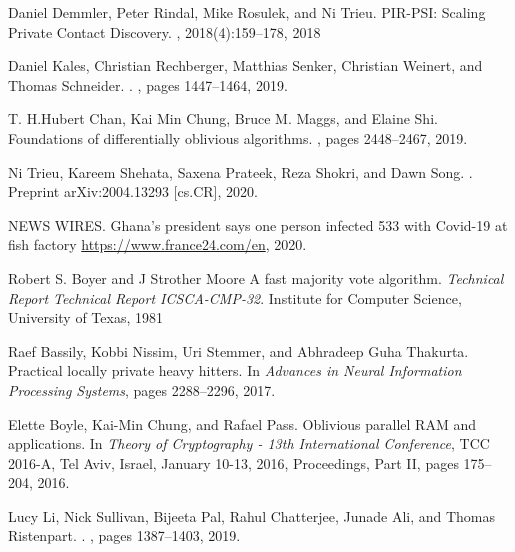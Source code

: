 \documentclass[11pt,dvipdfmx]{article}  %
\begin{document}
\begin{thebibliography}{10}
\begin{small}
 Daniel Demmler, Peter Rindal, Mike Rosulek, and
Ni Trieu. \newblock PIR-PSI: Scaling Private Contact Discovery.
, 2018(4):159–178, 2018

Daniel Kales, Christian Rechberger, Matthias Senker, Christian Weinert, and
  Thomas Schneider.
.
, pages
  1447--1464, 2019.
  
 T. H.Hubert Chan, Kai Min Chung, Bruce M. Maggs, and Elaine Shi. \newblock  Foundations of differentially oblivious algorithms. , pages 2448–2467, 2019.

Ni Trieu, Kareem Shehata, Saxena Prateek, Reza Shokri, and Dawn Song.
.
\newblock  Preprint arXiv:2004.13293 [cs.CR], 2020.

NEWS WIRES.
\newblock Ghana's president says one person infected 533 with Covid-19 at fish factory
\newblock
  \url{https://www.france24.com/en},
  2020.

 Robert S. Boyer and J Strother Moore \newblock A fast majority vote algorithm. {\em Technical Report Technical Report ICSCA-CMP-32}. \newblock Institute for Computer Science, University of Texas, 1981

 Raef Bassily, Kobbi Nissim, Uri Stemmer, and Abhradeep Guha Thakurta. \newblock  Practical locally private heavy hitters. \newblock In {\em Advances in Neural Information Processing Systems}, pages 2288–2296, 2017.

 Elette Boyle, Kai-Min Chung, and Rafael Pass. \newblock  Oblivious parallel RAM and applications.  \newblock In {\em Theory of Cryptography - 13th International Conference}, TCC 2016-A, Tel Aviv, Israel, January 10-13, 2016, Proceedings, Part II, pages 175–204, 2016.

Lucy Li, Nick Sullivan, Bijeeta Pal, Rahul Chatterjee, Junade Ali, and Thomas
  Ristenpart.
.
, pages 1387--1403, 2019.


 
\end{small}
\end{thebibliography}
\end{document}
